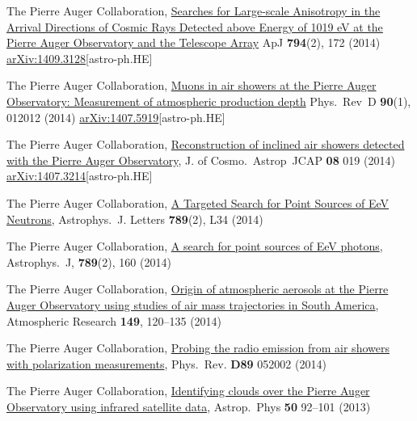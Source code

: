 \begin{etaremune}
\item {}The Pierre Auger Collaboration, \href{http://dx.doi.org/10.1088/0004-637X/794/2/172}{{Searches for Large-scale Anisotropy in the Arrival Directions of Cosmic Rays Detected above Energy of 1019 eV at the Pierre Auger Observatory and the Telescope Array}} ApJ {\textbf{794}}(2), 172 (2014) \href{http://arxiv.org/abs/1409.3128}{arXiv:1409.3128}[astro-ph.HE]

\item {}The Pierre Auger Collaboration, \href{http://journals.aps.org/prd/abstract/10.1103/PhysRevD.90.012012}{{Muons in air showers at the Pierre Auger Observatory: Measurement of atmospheric production depth}} Phys.\ Rev\  D {\textbf{90}}(1), 012012 (2014) \href{http://arxiv.org/abs/1407.5919}{arXiv:1407.5919}[astro-ph.HE]

\item {}The Pierre Auger Collaboration, \href{http://dx.doi.org/10.1088/1475-7516/2014/08/019}{{Reconstruction of inclined air showers detected with the Pierre Auger Observatory}}, J. of Cosmo.\ Astrop\  JCAP {\textbf{08}} 019 (2014) \href{http://arxiv.org/abs/1407.3214}{arXiv:1407.3214}[astro-ph.HE]
  
\item {}The Pierre Auger Collaboration, \href{http://iopscience.iop.org/2041-8205/789/2/L34}{{A Targeted Search for Point Sources of EeV Neutrons}}, Astrophys.\ J. Letters {\textbf{789}}(2), L34 (2014)

\item {}The Pierre Auger Collaboration, \href{http://iopscience.iop.org/0004-637X/789/2/160}{{A search for point sources of EeV photons}}, Astrophys.\ J, {\textbf{789}}(2), 160 (2014)

\item {}The Pierre Auger Collaboration, \href{http://dx.doi.org/10.1016/j.atmosres.2014.05.021}{{Origin of atmospheric aerosols at the Pierre Auger Observatory using studies of air mass trajectories in South America}}, Atmospheric Research {\textbf{149}}, 120--135 (2014)

\item {}The Pierre Auger Collaboration, \href{http://dx.doi.org/10.1103/PhysRevD.89.052002}{{Probing the radio emission from air showers with polarization measurements}}, Phys.\ Rev. {\textbf{D89}} 052002 (2014)

\item {}The Pierre Auger Collaboration, \href{http://dx.doi.org/10.1016/j.astropartphys.2013.09.004}{{Identifying clouds over the Pierre Auger Observatory using infrared satellite data}}, Astrop.\ Phys {\textbf{50}} 92--101 (2013)


\end{etaremune}
